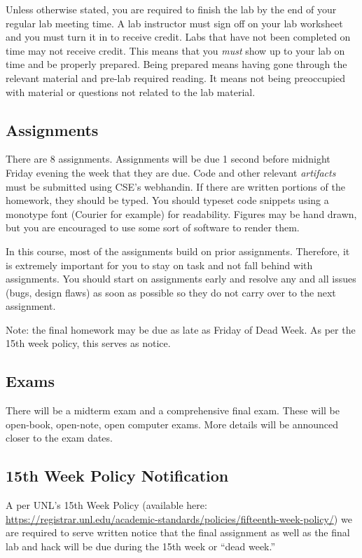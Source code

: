 \documentclass[12pt]{scrartcl}
\begin{document}
Unless otherwise stated, you are required to finish the lab by 
the end of your regular lab meeting time.  A lab instructor must 
sign off on your lab worksheet and you must turn it in to receive 
credit.  Labs that have not been completed on time may not receive
credit. This means that you \emph{must} show up to your lab on
time and be properly prepared.  Being prepared means having gone
through the relevant material and pre-lab required reading.  It 
means not being preoccupied with material or questions not related
to the lab material.  

\subsection{Assignments}

There are 8 assignments.  Assignments will be due 1 second before 
midnight Friday evening the week that they are due.  Code and other 
relevant \emph{artifacts} must be submitted using CSE's webhandin.  
If there are written portions of the homework, they should be typed.  
You should typeset code snippets using a monotype font (Courier for 
example) for readability.  Figures may be hand drawn, but you are 
encouraged to use some sort of software to render them.  

In this course, most of the assignments build on prior assignments.  
Therefore, it is extremely important for you to stay on task and not 
fall behind with assignments.  You should start on assignments early 
and resolve any and all issues (bugs, design flaws) as soon as 
possible so they do not carry over to the next assignment.

Note: the final homework may be due as late as Friday of Dead Week.  
As per the 15th week policy, this serves as notice.

\subsection{Exams}

There will be a midterm exam and a comprehensive final exam.  These
will be open-book, open-note, open computer exams.  More details will 
be announced closer to the exam dates.

\subsection{15th Week Policy Notification}
\label{subsection:deadweek}

A per UNL's 15th Week Policy (available here: \url{https://registrar.unl.edu/academic-standards/policies/fifteenth-week-policy/}) we are required
to serve written notice that the final assignment
as well as the final lab and hack will be due during the 15th 
week or ``dead week.''
\end{document}
